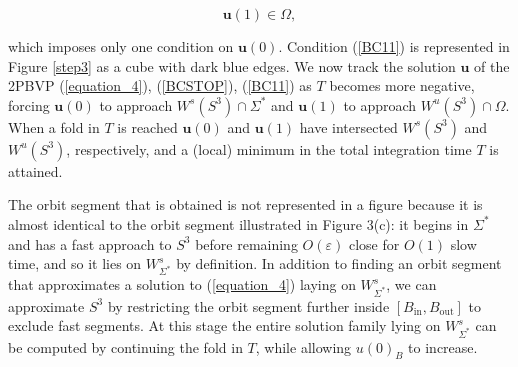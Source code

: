\documentclass{ws-ijbc}
\begin{document}
\begin{equation}
\mathbf{u}(1) \in \Omega,
\label{BC11}
\end{equation}
    
\noindent
which imposes only one condition on $\mathbf{u}(0)$.  Condition (\ref{BC11}) is represented in Figure \ref{step3} as a cube with dark blue edges.  We now track the solution $\mathbf{u}$ of the 2PBVP (\ref{equation_4}), (\ref{BCSTOP}), (\ref{BC11}) as $T$ becomes more negative, forcing $\mathbf{u}(0)$ to approach $W^s(S^3) \cap \Sigma^*$ and $\mathbf{u}(1)$ to approach $W^u(S^3) \cap \Omega$. When a fold in $T$ is reached $\mathbf{u}(0)$ and $\mathbf{u}(1)$ have intersected $W^s(S^3)$ and $W^u(S^3)$, respectively, and a (local) minimum in the total integration time $T$ is attained.  
    
The orbit segment that is obtained is not represented in a figure because it is almost identical to the orbit segment illustrated in Figure 3(c): it begins in $\Sigma^*$ and has a fast approach to $S^3$ before remaining $O(\varepsilon)$ close for $O(1)$ slow time, and so it lies on $W^{s}_{\Sigma^*}$ by definition.  In addition to finding an orbit segment that approximates a solution to (\ref{equation_4}) laying on $W^s_{\Sigma^*}$, we can approximate $S^3$ by restricting the orbit segment further inside $[B_{\text{in}},B_{\text{out}}]$ to exclude fast segments. At this stage the entire solution family lying on $W^s_{\Sigma^*}$ can be computed by continuing the fold in $T$, while allowing $u(0)_B$ to increase.  
\end{document}
